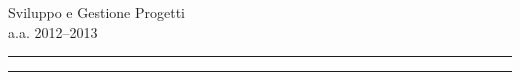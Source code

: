 \pagestyle{empty}
\begin{center}

{\sffamily
Sviluppo e Gestione Progetti\\
a.a. 2012--2013
}

\vskip 1.5cm

{
\setlength{\fboxsep}{.2pt}
 {
  }
}

\vskip 1.5cm

{\Huge\sffamily\bfseries
\docauthor
}

\vskip 2.5cm

{\Large\sffamily\bfseries
\caName
}

\vskip 2cm

\hrule
\vskip 10pt
{\Huge\scshape
\doctitle
}
\vskip 10pt
\hrule

\end{center}

\clearpage